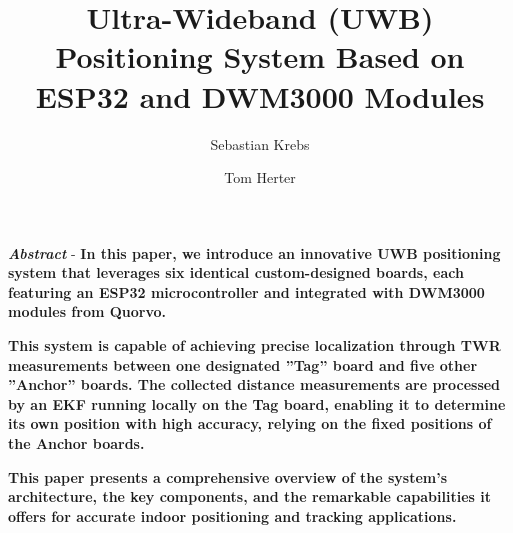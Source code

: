 \documentclass[10pt,a4paper,twocolumn]{article}
\begin{document}
\providecommand{\ShortAuthorList}[0]{S. Krebs, T. Herter} %
\title{Ultra-Wideband (UWB) Positioning System Based on ESP32 and DWM3000 Modules}
\author[1]{Sebastian Krebs}
\author[1]{Tom Herter}

\date{\dateline{\today}}

\maketitle
\vspace*{-1.3cm}

\section*{}
\textbf{\textit{Abstract}} - \textbf{
  In this paper, we introduce an innovative \ac{UWB} positioning system
  that leverages six identical custom-designed boards,
  each featuring an \ac{ESP32} microcontroller and integrated with \ac{DWM3000}
  modules from Quorvo.}

  \textbf{This system is capable of achieving precise localization through \ac{TWR}
  measurements between one designated ''Tag'' board and five other ''Anchor'' boards.
  The collected distance measurements are processed by an \ac{EKF} running locally
  on the Tag board, enabling it to determine its own position with high accuracy,
  relying on the fixed positions of the Anchor boards.}

  \textbf{This paper presents a comprehensive overview of the system's architecture,
  the key components, and the remarkable capabilities it offers for accurate
  indoor positioning and tracking applications.}

\vspace*{.28cm}
\end{document}
